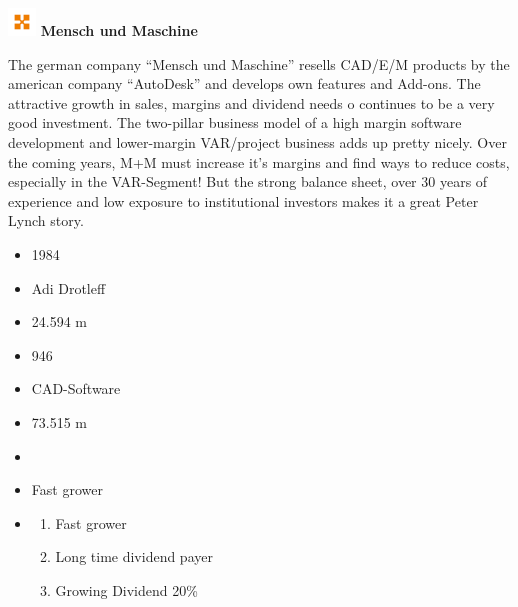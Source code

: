 \documentclass[11pt]{scrartcl}
\begin{document}



\begin{minipage}{\textwidth}
    \center\includegraphics[width=2em]{company_logo.png}
    {\textbf{Mensch und Maschine}}
\end{minipage}




\begin{minipage}[t]{0,75\linewidth}
    The german company \enquote{Mensch und Maschine} resells CAD/E/M
    products by the american company \enquote{AutoDesk} and develops
    own features and Add-ons. The attractive growth in sales, margins
    and dividend needs o continues to be a very good investment. The
    two-pillar business model of a high margin software development and
    lower-margin VAR/project business adds up pretty nicely. Over the
    coming years, M+M must increase it's margins and find ways to reduce
    costs, especially in the VAR-Segment! But the strong balance sheet,
    over 30 years of experience and low exposure to institutional investors
    makes it a great Peter Lynch story.
\end{minipage}
\begin{minipage}[t]{0,25\linewidth}
    \begin{itemize}\scriptsize
        \item [\faAsterisk] 1984
        \item [\faMale] Adi Drotleff
        \item [\faEuro] \faEuro \num{24.594} m
        \item [\faUsers] \num{946}
        \item [\faIndustry] CAD-Software
        \item [\faBook] \faEuro \num{73,515} m
        \item [\reflectbox{\rotatebox[origin=c]{270}{\faLevelDown}}] \faEuro
        \item [\faFolderOpen]Fast grower
        \item [\faQuestion]
        \begin{enumerate}
            \item Fast grower
            \item Long time dividend payer
            \item Growing Dividend 20\%
        \end{enumerate}

    \end{itemize}
\end{minipage}
\end{document}

